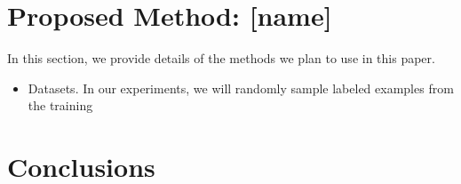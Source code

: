 \documentclass{report}
\begin{document}
\section{Proposed Method: [name]}


In this section, we provide details of the methods we plan to use in this paper.

\begin{itemize}
    \item Datasets. In our experiments, we will randomly sample labeled examples from the training 
\end{itemize}



\section{Conclusions}

















\end{document}
